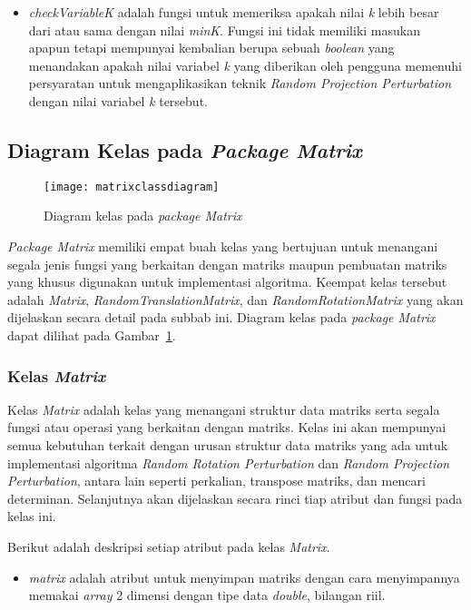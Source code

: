\begin{itemize}
	\item \textit{checkVariableK} adalah fungsi untuk memeriksa apakah nilai \textit{k} lebih besar dari atau sama dengan nilai \textit{minK}. Fungsi ini tidak memiliki masukan apapun tetapi mempunyai kembalian berupa sebuah \textit{boolean} yang menandakan apakah nilai variabel \textit{k} yang diberikan oleh pengguna memenuhi persyaratan untuk mengaplikasikan teknik \textit{Random Projection Perturbation} dengan nilai variabel \textit{k} tersebut.
\end{itemize}

\subsection{Diagram Kelas pada \textit{Package Matrix}}
\label{subsec:diagram-kelas-matrix}

\begin{figure}
	\centering
	\texttt{[image: matrixclassdiagram]}
	\caption{Diagram kelas pada \textit{package Matrix}}
	\label{fig:matrixclassdiagram}
\end{figure}

\textit{Package Matrix} memiliki empat buah kelas yang bertujuan untuk menangani segala jenis fungsi yang berkaitan dengan matriks maupun pembuatan matriks yang khusus digunakan untuk implementasi algoritma. Keempat kelas tersebut adalah \textit{Matrix}, \textit{RandomTranslationMatrix}, dan \textit{RandomRotationMatrix} yang akan dijelaskan secara detail pada subbab ini. Diagram kelas pada \textit{package Matrix} dapat dilihat pada Gambar~\ref{fig:matrixclassdiagram}.

\subsubsection{Kelas \textit{Matrix}}
\label{subsubsec:kelas-matrix}

Kelas \textit{Matrix} adalah kelas yang menangani struktur data matriks serta segala fungsi atau operasi yang berkaitan dengan matriks. Kelas ini akan mempunyai semua kebutuhan terkait dengan urusan struktur data matriks yang ada untuk implementasi algoritma \textit{Random Rotation Perturbation} dan \textit{Random Projection Perturbation}, antara lain seperti perkalian, transpose matriks, dan mencari determinan. Selanjutnya akan dijelaskan secara rinci tiap atribut dan fungsi pada kelas ini.

Berikut adalah deskripsi setiap atribut pada kelas \textit{Matrix}.
\begin{itemize}
	\item \textit{matrix} adalah atribut untuk menyimpan matriks dengan cara menyimpannya memakai \textit{array} 2 dimensi dengan tipe data \textit{double}, bilangan riil.
\end{itemize}

